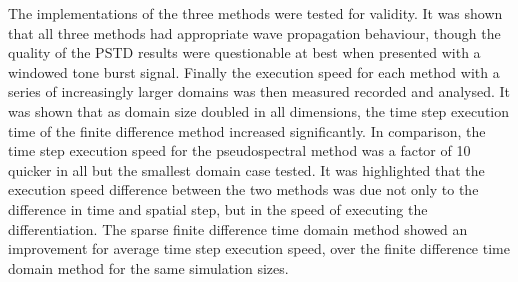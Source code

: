 The implementations of the three methods were tested for validity. It was shown that all three methods had appropriate wave propagation behaviour, though the quality of the PSTD  results were questionable at best when presented with a windowed tone burst signal. Finally the execution speed for each method with a series of increasingly larger domains was then measured recorded and analysed. It was shown that as domain size doubled in all dimensions, the time step execution time of the finite difference method increased significantly. In comparison, the time step execution speed for the pseudospectral method was a factor of 10 quicker in all but the smallest domain case tested. It was highlighted that the execution speed difference between the two methods was due not only to the difference in time and spatial step, but in the speed of executing the differentiation. The sparse finite difference time domain method showed an improvement for average time step execution speed, over the finite difference time domain method for the same simulation sizes. \\

